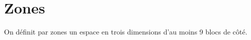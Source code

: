 \section{Zones}
\begin{flushleft}
	On d\'efinit par zones un espace en trois dimensions d'au moins 9 blocs de c\^ot\'e.

\end{flushleft}
